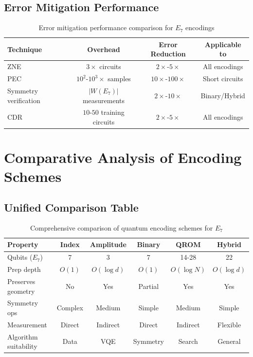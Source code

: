 \subsection{Error Mitigation Performance}

\begin{table}[h]
\centering
\begin{tabular}{lccc}
\toprule
\textbf{Technique} & \textbf{Overhead} & \textbf{Error Reduction} & \textbf{Applicable to} \\
\midrule
ZNE & $3\times$ circuits & $2\times$-$5\times$ & All encodings \\
PEC & $10^2$-$10^3\times$ samples & $10\times$-$100\times$ & Short circuits \\
Symmetry verification & $|W(E_7)|$ measurements & $2\times$-$10\times$ & Binary/Hybrid \\
CDR & $10$-$50$ training circuits & $2\times$-$5\times$ & All encodings \\
\bottomrule
\end{tabular}
\caption{Error mitigation performance comparison for $E_7$ encodings}
\label{tab:error_mitigation_performance}
\end{table}

\section{Comparative Analysis of Encoding Schemes}

\subsection{Unified Comparison Table}

\begin{table}[h]
\centering
\small
\begin{tabular}{lccccc}
\toprule
\textbf{Property} & \textbf{Index} & \textbf{Amplitude} & \textbf{Binary} & \textbf{QROM} & \textbf{Hybrid} \\
\midrule
Qubits ($E_7$) & 7 & 3 & 7 & 14-28 & 22 \\
Prep depth & $O(1)$ & $O(\log d)$ & $O(1)$ & $O(\log N)$ & $O(\log d)$ \\
Preserves geometry & No & Yes & Partial & Yes & Yes \\
Symmetry ops & Complex & Medium & Simple & Medium & Simple \\
Measurement & Direct & Indirect & Direct & Indirect & Flexible \\
Algorithm suitability & Data & VQE & Symmetry & Search & General \\
\bottomrule
\end{tabular}
\caption{Comprehensive comparison of quantum encoding schemes for $E_7$}
\label{tab:encoding_comparison}
\end{table}

